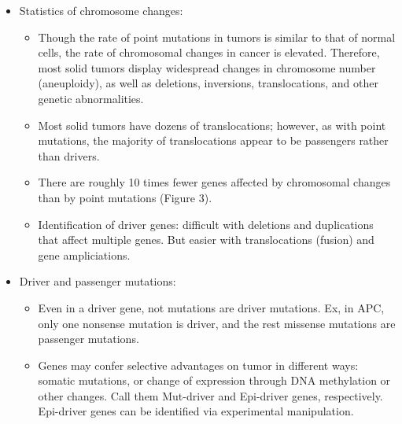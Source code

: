\documentclass{report}
\begin{document}
\begin{itemize}
	\item Statistics of chromosome changes: 
	\begin{itemize}
		\item Though the rate of point mutations in tumors is similar to that of normal cells, the rate of chromosomal changes in cancer is elevated. Therefore, most solid tumors display widespread changes in chromosome number (aneuploidy), as well as deletions, inversions, translocations, and other genetic abnormalities.
		\item Most solid tumors have dozens of translocations; however, as with point mutations, the majority of translocations appear to be passengers rather than drivers. 
		\item There are roughly 10 times fewer genes affected by chromosomal changes than by point mutations (Figure 3).
		\item Identification of driver genes: difficult with deletions and duplications that affect multiple genes. But easier with translocations (fusion) and gene ampliciations.  
	\end{itemize}
	
	\item Driver and passenger mutations:
	\begin{itemize}
		\item  Even in a driver gene, not mutations are driver mutations. Ex, in APC, only one nonsense mutation is driver, and the rest missense mutations are passenger mutations. 
		\item Genes may confer selective advantages on tumor in different ways: somatic mutations, or change of expression through DNA methylation or other changes. Call them Mut-driver and Epi-driver genes, respectively. Epi-driver genes can be identified via experimental manipulation. 
	\end{itemize}
	

\end{itemize}
\end{document}
